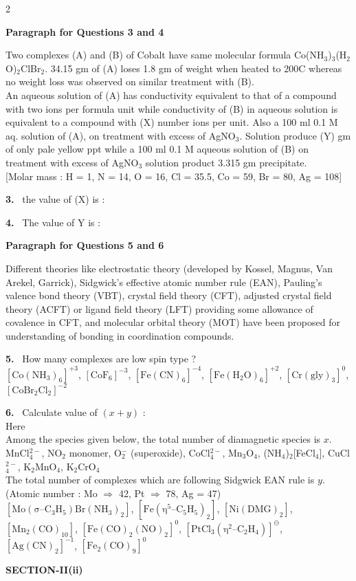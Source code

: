 \documentclass[10pt]{extarticle}
\newcommand{\sect}[1]{\par\smallskip\noindent\textbf{#1}\par}
\newcommand{\qn}[1]{\par\smallskip\noindent\textbf{#1.}~}
\newcommand{\paraq}[2]{\par\smallskip\noindent\textbf{Paragraph for Questions #1 and #2}\par}
\begin{document}
\begin{multicols}{2}
\paraq{3}{4}
Two complexes (A) and (B) of Cobalt have same molecular formula Co(NH$_3$)$_3$(H$_2$O)$_2$ClBr$_2$. 34.15 gm of (A) loses 1.8 gm of weight when heated to 200\textdegree C whereas no weight loss was observed on similar treatment with (B).\\
An aqueous solution of (A) has conductivity equivalent to that of a compound with two ions per formula unit while conductivity of (B) in aqueous solution is equivalent to a compound with (X) number ions per unit. Also a 100 ml 0.1 M aq. solution of (A), on treatment with excess of AgNO$_3$. Solution produce (Y) gm of only pale yellow ppt while a 100 ml 0.1 M aqueous solution of (B) on treatment with excess of AgNO$_3$ solution product 3.315 gm precipitate.\\
{[}Molar mass : H = 1, N = 14, O = 16, Cl = 35.5, Co = 59, Br = 80, Ag = 108{]}
\qn{3} the value of (X) is :
\qn{4} The value of Y is :
\paraq{5}{6}
Different theories like electrostatic theory (developed by Kossel, Magnus, Van Arekel, Garrick), Sidgwick's effective atomic number rule (EAN), Pauling's valence bond theory (VBT), crystal field theory (CFT), adjusted crystal field theory (ACFT) or ligand field theory (LFT) providing some allowance of covalence in CFT, and molecular orbital theory (MOT) have been proposed for understanding of bonding in coordination compounds.
\qn{5} How many complexes are low spin type ?\\
$[\mathrm{Co(NH_3)_6}]^{+3}$, $[\mathrm{CoF_6}]^{-3}$, $[\mathrm{Fe(CN)_6}]^{-4}$, $[\mathrm{Fe(H_2O)_6}]^{+2}$, $[\mathrm{Cr(gly)_3}]^{0}$, $[\mathrm{CoBr_2Cl_2}]^{-2}$
\qn{6} Calculate value of $(x+y)$ :\\
Here\\
Among the species given below, the total number of diamagnetic species is $x$.\\
MnCl$_4^{2-}$, NO$_2$ monomer, O$_2^-$ (superoxide), CoCl$_4^{2-}$, Mn$_3$O$_4$, (NH$_4$)$_2$[FeCl$_4$], CuCl$_4^{2-}$, K$_2$MnO$_4$, K$_2$CrO$_4$\\
The total number of complexes which are following Sidgwick EAN rule is $y$.\\
(Atomic number : Mo $\Rightarrow$ 42, Pt $\Rightarrow$ 78, Ag = 47)\\
$[\mathrm{Mo(\sigma\text{--}C_3H_5)Br(NH_3)_2}]$, $[\mathrm{Fe(\eta^5\text{--}C_5H_5)_2}]$, $[\mathrm{Ni(DMG)_2}]$, $[\mathrm{Mn_2(CO)_{10}}]$, $[\mathrm{Fe(CO)_2(NO)_2}]^{0}$, $[\mathrm{PtCl_3(\eta^2\text{--}C_2H_4)}]^{\ominus}$, $[\mathrm{Ag(CN)_2}]^{-1}$, $[\mathrm{Fe_2(CO)_9}]^{0}$
\sect{SECTION-II(ii)}

\end{multicols}
\end{document}
